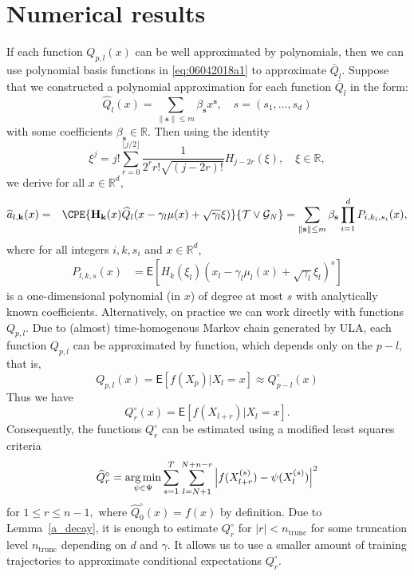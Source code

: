 \documentclass[bj]{imsart}
\def\rset{\mathbb{R}}
\def\TrainSet{\mathcal{T}}
\newcommand*{\argmin}{\operatornamewithlimits{arg\,min}}
\begin{document}
\section{Numerical results}
\label{sec:num}
If each function  \(Q_{p,l}(x) \) can be well approximated by polynomials, then we can use polynomial basis functions in   \eqref{eq:06042018a1} to approximate \(\bar Q_l\). Suppose that we constructed a polynomial approximation  for each function \(\bar Q_{l}\)  in the form:
\begin{equation*}
\widehat{Q}_{l}(x) = \sum_{\|\mathbf{s}\|\leq m} \beta_{\mathbf{s}} x^{\mathbf{s}},\quad s=(s_1,\ldots,s_d)
\end{equation*}
with some coefficients \(\beta_{\mathbf{s}}\in \mathbb{R}.\)
Then using the identity
\[
\xi^j = j! \sum_{r = 0}^{\lfloor j/2 \rfloor} \frac{1}{2^r  r! \sqrt{(j-2r)!}} H_{j-2r}(\xi),\quad \xi \in \mathbb{R},
\]
we derive for all $x \in \mathbb{R}^d$,
\begin{eqnarray*}
\widehat a_{l,\mathbf{k}} (x) &=&\CPE{\mathbf{H}_\mathbf{k}(x) \widehat{Q}_{l}(x - \gamma_l \mu(x) + \sqrt{\gamma_l}\xi)}{\TrainSet \vee \mathcal{G}_N}
= \sum_{\|\mathbf{s}\|\leq m} \beta_{\mathbf{s}} \prod_{i=1}^d P_{i,k_i,s_i}(x),
\end{eqnarray*}
where for all integers $i,k,s_i$ and $x \in \rset^d$,
\begin{align*}
P_{l,k,s}(x) &= \mathsf{E} \left[ H_{k}(\xi_l) (x_l - \gamma_l \mu_l(x) + \sqrt{\gamma_l} \xi_l)^{s} \right]
\end{align*}
is a one-dimensional polynomial (in \(x\)) of degree at most \(s\) with analytically known coefficients. Alternatively, on practice we can work directly with functions \(Q_{p,l}.\) Due to (almost) time-homogenous Markov chain generated by ULA, each function $Q_{p,l}$ can be approximated by function, which depends only on the  $p-l$, that is,
\[
 Q_{p,l}(x) = \mathsf{E} \left[f(X_p) | X_l = x\right] \approx Q^\circ_{p-l}(x)
 \]
Thus we have
\[
  Q^\circ_{r}(x) = \mathsf{E} \left[f(X_{l+r}) | X_l = x \right].
 \]
Consequently, the functions $Q^\circ_r$ can be estimated using a modified least squares criteria
\begin{eqnarray}
\label{eq:Qcircr}
\widehat{Q}^\circ_r = \argmin_{\psi \in \Psi} \sum_{s = 1}^{T} \sum_{l = N + 1}^{N+n-r} \left| f(X_{l+r}^{(s)}) - \psi(X_l^{(s)})\right|^2
\end{eqnarray}
for \(1 \leq r \leq n-1,\) where  $\widehat{Q}^\circ_0(x) = f(x)$ by definition.
Due to Lemma~\ref{a_decay}, it is enough to estimate $Q^\circ_{r}$ for $|r| < n_{\mathrm{trunc}}$ for some truncation level \(n_{\mathrm{trunc}}\) depending on \(d\) and \(\gamma.\) It allows us to use a smaller amount of training trajectories to approximate conditional expectations $Q^\circ_{r}$.
\end{document}
